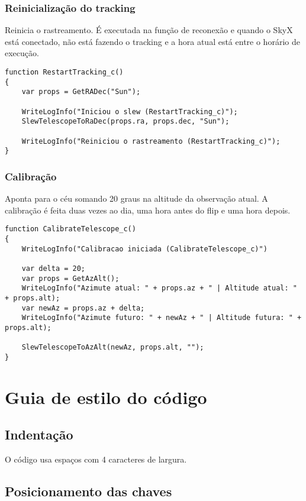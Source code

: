 \documentclass{article}
\begin{document}
\subsubsection{Reinicialização do tracking}

Reinicia o rastreamento. É executada na função de reconexão e quando o SkyX está conectado, não está fazendo o tracking e a hora atual está entre o horário de execução.

\begin{lstlisting}
function RestartTracking_c()
{
    var props = GetRADec("Sun");

    WriteLogInfo("Iniciou o slew (RestartTracking_c)");
    SlewTelescopeToRaDec(props.ra, props.dec, "Sun");

    WriteLogInfo("Reiniciou o rastreamento (RestartTracking_c)");
}
\end{lstlisting}

\subsubsection{Calibração}

Aponta para o céu somando 20 graus na altitude da observação atual. A calibração é feita duas vezes ao dia, uma hora antes do flip e uma hora depois.

\begin{lstlisting}
function CalibrateTelescope_c()
{
    WriteLogInfo("Calibracao iniciada (CalibrateTelescope_c)")

    var delta = 20;
    var props = GetAzAlt();
    WriteLogInfo("Azimute atual: " + props.az + " | Altitude atual: " + props.alt);
    var newAz = props.az + delta;
    WriteLogInfo("Azimute futuro: " + newAz + " | Altitude futura: " + props.alt);

    SlewTelescopeToAzAlt(newAz, props.alt, "");
}
\end{lstlisting}

\section{Guia de estilo do código}

\subsection{Indentação}

O código usa espaços com 4 caracteres de largura.

\subsection{Posicionamento das chaves}
\end{document}
